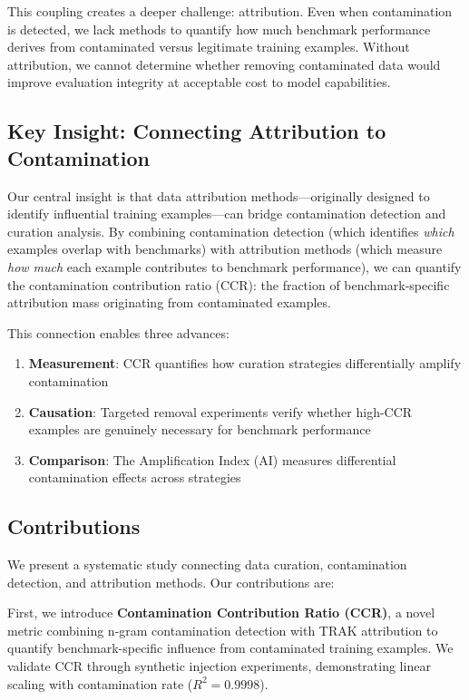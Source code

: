 This coupling creates a deeper challenge: attribution. Even when contamination is detected, we lack methods to quantify how much benchmark performance derives from contaminated versus legitimate training examples. Without attribution, we cannot determine whether removing contaminated data would improve evaluation integrity at acceptable cost to model capabilities.

\subsection{Key Insight: Connecting Attribution to Contamination}

Our central insight is that data attribution methods---originally designed to identify influential training examples---can bridge contamination detection and curation analysis. By combining contamination detection (which identifies \textit{which} examples overlap with benchmarks) with attribution methods (which measure \textit{how much} each example contributes to benchmark performance), we can quantify the contamination contribution ratio (CCR): the fraction of benchmark-specific attribution mass originating from contaminated examples.

This connection enables three advances:
\begin{enumerate}
    \item \textbf{Measurement}: CCR quantifies how curation strategies differentially amplify contamination
    \item \textbf{Causation}: Targeted removal experiments verify whether high-CCR examples are genuinely necessary for benchmark performance
    \item \textbf{Comparison}: The Amplification Index (AI) measures differential contamination effects across strategies
\end{enumerate}

\subsection{Contributions}

We present a systematic study connecting data curation, contamination detection, and attribution methods. Our contributions are:

First, we introduce \textbf{Contamination Contribution Ratio (CCR)}, a novel metric combining n-gram contamination detection with TRAK attribution to quantify benchmark-specific influence from contaminated training examples. We validate CCR through synthetic injection experiments, demonstrating linear scaling with contamination rate ($R^2 = 0.9998$).

